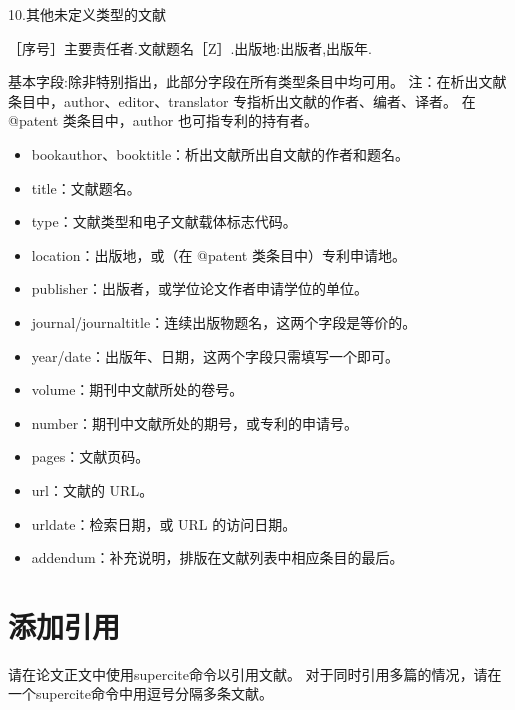  10.其他未定义类型的文献 
 
  ［序号］主要责任者.文献题名［Z］.出版地:出版者,出版年.
  

基本字段:除非特别指出，此部分字段在所有类型条目中均可用。 
注：在析出文献条目中，author、editor、translator 专指析出文献的作者、编者、译者。
在 @patent 类条目中，author 也可指专利的持有者。 

\begin{itemize}
	\item bookauthor、booktitle：析出文献所出自文献的作者和题名。 
	\item title：文献题名。 
	\item type：文献类型和电子文献载体标志代码。 
	\item location：出版地，或（在 @patent 类条目中）专利申请地。 
	\item publisher：出版者，或学位论文作者申请学位的单位。 
	\item journal/journaltitle：连续出版物题名，这两个字段是等价的。 
	\item year/date：出版年、日期，这两个字段只需填写一个即可。 
	\item volume：期刊中文献所处的卷号。 
	\item number：期刊中文献所处的期号，或专利的申请号。 
	\item pages：文献页码。 
	\item url：文献的 URL。 
	\item urldate：检索日期，或 URL 的访问日期。 
	\item addendum：补充说明，排版在文献列表中相应条目的最后。
\end{itemize}

\section{添加引用}
请在论文正文中使用supercite命令以引用文献\supercite{Kajiya86}。
对于同时引用多篇的情况\supercite{Houdini, Han07GeoFilter}，请在一个supercite命令中用逗号分隔多条文献\supercite{Hu07, Kim2019, Ernst05}。